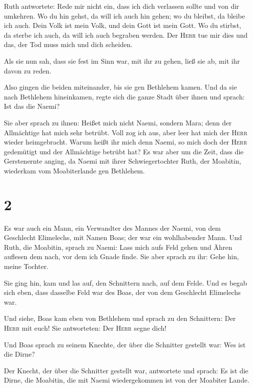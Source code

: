  Ruth antwortete: Rede mir nicht ein, dass ich dich
verlassen sollte und von dir umkehren. Wo du hin gehst, da will ich auch
hin gehen; wo du bleibst, da bleibe ich auch. Dein Volk ist mein Volk,
und dein Gott ist mein Gott.  Wo du stirbst, da sterbe
ich auch, da will ich auch begraben werden. Der \textsc{Herr} tue mir
dies und das, der Tod muss mich und dich scheiden.

 Als sie nun sah, dass sie fest im Sinn war, mit ihr zu
gehen, ließ sie ab, mit ihr davon zu reden.

 Also gingen die beiden miteinander, bis sie gen
Bethlehem kamen. Und da sie nach Bethlehem hineinkamen, regte sich die
ganze Stadt über ihnen und sprach: Ist das die Naemi?

 Sie aber sprach zu ihnen: Heißet mich nicht Naemi,
sondern Mara; denn der Allmächtige hat mich sehr betrübt.
 Voll zog ich aus, aber leer hat mich der \textsc{Herr}
wieder heimgebracht. Warum heißt ihr mich denn Naemi, so mich doch der
\textsc{Herr} gedemütigt und der Allmächtige betrübt hat?
 Es war aber um die Zeit, dass die Gerstenernte anging,
da Naemi mit ihrer Schwiegertochter Ruth, der Moabitin, wiederkam vom
Moabiterlande gen Bethlehem.

\hypertarget{section-1}{%
\section{2}\label{section-1}}

 Es war auch ein Mann, ein Verwandter des Mannes der
Naemi, von dem Geschlecht Elimelechs, mit Namen Boas; der war ein
wohlhabender Mann.  Und Ruth, die Moabitin, sprach zu
Naemi: Lass mich aufs Feld gehen und Ähren auflesen dem nach, vor dem
ich Gnade finde. Sie aber sprach zu ihr: Gehe hin, meine Tochter.

 Sie ging hin, kam und las auf, den Schnittern nach, auf
dem Felde. Und es begab sich eben, dass dasselbe Feld war des Boas, der
von dem Geschlecht Elimelechs war.

 Und siehe, Boas kam eben von Bethlehem und sprach zu den
Schnittern: Der \textsc{Herr} mit euch! Sie antworteten: Der
\textsc{Herr} segne dich!

 Und Boas sprach zu seinem Knechte, der über die Schnitter
gestellt war: Wes ist die Dirne?

 Der Knecht, der über die Schnitter gestellt war,
antwortete und sprach: Es ist die Dirne, die Moabitin, die mit Naemi
wiedergekommen ist von der Moabiter Lande.

